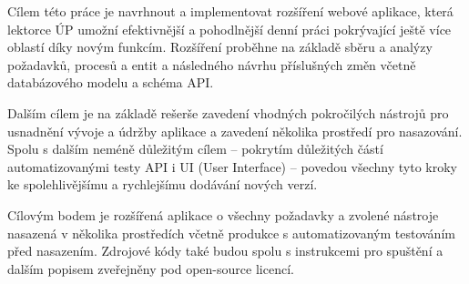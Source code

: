 Cílem této práce je navrhnout a implementovat rozšíření webové aplikace, která lektorce ÚP umožní efektivnější a pohodlnější denní práci pokrývající ještě více oblastí díky novým funkcím. Rozšíření proběhne na základě sběru a analýzy požadavků, procesů a entit a následného návrhu příslušných změn včetně databázového modelu a schéma API.

Dalším cílem je na základě rešerše zavedení vhodných pokročilých nástrojů pro usnadnění vývoje a údržby aplikace a zavedení několika prostředí pro nasazování. Spolu s dalším neméně důležitým cílem -- pokrytím důležitých částí automatizovanými testy API i UI (User Interface) -- povedou všechny tyto kroky ke spolehlivějšímu a rychlejšímu dodávání nových verzí.

Cílovým bodem je rozšířená aplikace o všechny požadavky a zvolené nástroje nasazená v několika prostředích včetně produkce s automatizovaným testováním před nasazením. Zdrojové kódy také budou spolu s instrukcemi pro spuštění a dalším popisem zveřejněny pod open-source licencí.

